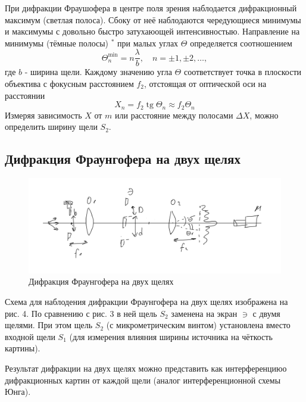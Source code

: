 \documentclass[a4paper, 12pt]{article}
\begin{document}
При дифракции Фраушофера в центре поля зрения наблодается дифракционный максимум (светлая полоса). Сбоку от неё наблодаются чередующиеся минимумы и максимумы с довольно быстро затухаюощей интенсивностыю. Направление на минимумы (тёмные полосы) ${ }^*$ при малых углах $\Theta$ определяется соотношением
$$
\Theta_n^{\min }=n \frac{\lambda}{b}, \quad n= \pm 1, \pm 2, \ldots,
$$
где $b$ - ширина щели. Каждому значению угла $\Theta$ соответствует точка в плоскости объектива с фокусным расстоянием $f_2$, отстоящая от оптической оси на расстоянии
$$
X_n=f_2 \operatorname{tg} \Theta_n \approx f_2 \Theta_n
$$
Измеряя зависимость $X$ от $m$ или расстояние между полосами $\Delta X$, можно определить ширину щели $S_2$.


\subsection*{Дифракция Фраунгофера на двух щелях}

\begin{figure}[H]
    \centering
    \includegraphics[width=1\textwidth]{fraun2.jpg}
    \caption{Дифракция Фраунгофера на двух щелях}
    \label{fig:ris3}
\end{figure}

Схема для наблодения дифракции Фраунгофера на двух щелях изображена на рис. 4. По сравнению с рис. 3 в ней щель $S_2$ заменена на экран $\ni$ с двумя щелями. При этом щель $S_2$ (с микрометрическим винтом) установлена вместо входной щели $S_1$ (для измерения влияния ширины источника на чёткость картины).

Результат дифракции на двух щелях можно представить как интерференциюо дифракционных картин от каждой щели (аналог интерференционной схемы Юнга).
\end{document}
